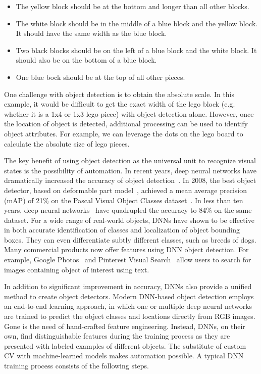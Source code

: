 \begin{itemize}
  \item The yellow block should be at the bottom and longer than all other blocks.
  \item The white block should be in the middle of a blue block and the yellow
  block. It should have the same width as the blue block.
  \item Two black blocks should be on the left of a blue block and the white
  block. It should also be on the bottom of a blue block.
  \item One blue bock should be at the top of all other pieces.
\end{itemize}

One challenge with object detection is to obtain the absolute scale. In this
example, it would be difficult to get the exact width of the lego block (e.g.
whether it is a 1x4 or 1x3 lego piece) with object detection alone. However,
once the location of object is detected, additional processing can be used to
identify object attributes. For example, we can leverage the dots
on the lego board to calculate the absolute size of lego pieces.

The key benefit of using object detection as the universal unit to recognize
visual states is the possibility of automation. In recent years, deep neural
networks have dramatically increased the accuracy of object
detection~\cite{zou2019object}. In 2008, the best object detector, based on
deformable part model~\cite{felzenszwalb2008discriminatively}, achieved a mean
average precision (mAP) of 21\% on the Pascal Visual Object Classes
dataset~\cite{everingham2010pascal}. In less than ten years, deep neural
networks~\cite{he2017mask,Ren2015,He2016,lin2017focal} have quadrupled the
accuracy to 84\% on the same dataset. For a wide range of real-world objects,
DNNs have shown to be effective in both accurate identification of classes and
localization of object bounding boxes.  They can even differentiate subtly
different classes, such as breeds of dogs. Many commercial products now offer
features using DNN object detection. For example, Google
Photos~\cite{googlePhoto} and Pinterest Visual Search~\cite{pinterest} allow
users to search for images containing object of interest using text.

In addition to significant improvement in accuracy, DNNs also provide a unified
method to create object detectors. Modern DNN-based object detection employs an
end-to-end learning approach, in which one or multiple deep neural networks are
trained to predict the object classes and locations directly from RGB images.
Gone is the need of hand-crafted feature engineering. Instead, DNNs, on their
own, find distinguishable features during the training process as they are
presented with labeled examples of different objects. The substitute of custom
CV with machine-learned models makes automation possible. A typical DNN training
process consists of the following steps.

